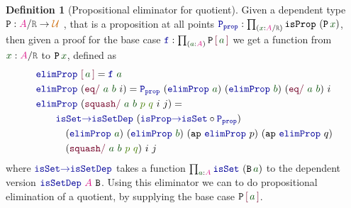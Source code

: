 \documentclass[twoside,11pt,openright]{report}
\theoremstyle{plain} %
\theoremstyle{definition}
\newtheorem{defn}[thm]{Definition}%
\theoremstyle{remark}
\newcommand*{\term}[1]{\textcolor{green!30!black}{#1}} %
\newcommand*{\pathterm}[1]{\textcolor{green!65!red!75!black}{#1}}
\newcommand*{\type}[1]{\textcolor{magenta!90!black}{#1}}
\newcommand*{\universe}[1]{\textcolor{orange!80!black}{#1}}
\newcommand*{\relation}[1]{\textcolor{gray!75!black}{\ensuremath{\mathtt{#1}}}}
\newcommand*{\function}[1]{\textcolor{blue!60!black}{\ensuremath{\mathtt{#1}}}}
\newcommand*{\constructor}[1]{\textcolor{purple!60!black}{\ensuremath{\mathtt{#1}}}}
\newcommand*{\typeformer}[1]{\ensuremath{\mathtt{#1}}}
\newcommand*{\quotientconstructor}[1]{\constructor{[}\,#1\,\constructor{]}}
\begin{document}
\begin{defn}[Propositional eliminator for quotient]
  \label{defn:propositional-elimination-quotient}
  Given a dependent type \(\typeformer{P} : \type{A} / \relation{R} \rightarrow \universe{\mathcal{U}}\) , that is a proposition at all points \(\function{P_{prop}} : \prod_{(\term{x} : \type{A} / \relation{R})} \typeformer{isProp}~(\typeformer{P}\,\term{x})\), then given a proof for the base case \(\function{f} : \prod_{(\term{a} : \type{A})} \typeformer{P}\,\quotientconstructor{\term{a}}\) we get a function from \(\term{x} : \type{A} / \relation{R}\) to \(\typeformer{P}\,\term{x}\), defined as
  \begin{equation}
    \begin{aligned}
      &\function{elimProp}~\quotientconstructor{\term{a}} = \function{f}~\term{a}\\
      &\function{elimProp}~(\constructor{eq/}~\term{a}~\term{b}~i) = \function{P_{prop}}~(\function{elimProp}~\term{a})~(\function{elimProp}~\term{b})~(\constructor{eq/}~\term{a}~\term{b})~i \\
      &\function{elimProp}~(\constructor{squash/}~\term{a}~\term{b}~\pathterm{p}~\pathterm{q}~i~j) = \\
      &\qquad\function{isSet{\rightarrow}isSetDep}~(\function{isProp{\rightarrow}isSet} \circ \function{P_{prop}}) \\
      &\qquad\quad (\function{elimProp}~\term{a})~(\function{elimProp}~\term{b})~(\mathtt{ap}~\function{elimProp}~p)~(\mathtt{ap}~\function{elimProp}~q)\\
      &\qquad\quad (\constructor{squash/}~\term{a}~\term{b}~\pathterm{p}~\pathterm{q})~i~j
    \end{aligned}
  \end{equation}
  where \(\function{isSet{\rightarrow}isSetDep}\) takes a function \(\prod_{\term{a} : \type{A}} \function{isSet}~(\typeformer{B}\,\term{a})\) to the dependent version \(\function{isSetDep}~\type{A}~\typeformer{B}\). Using this eliminator we can to do propositional elimination of a quotient, by supplying the base case \(\typeformer{P}\,\quotientconstructor{\term{a}}\).
\end{defn}
\end{document}
